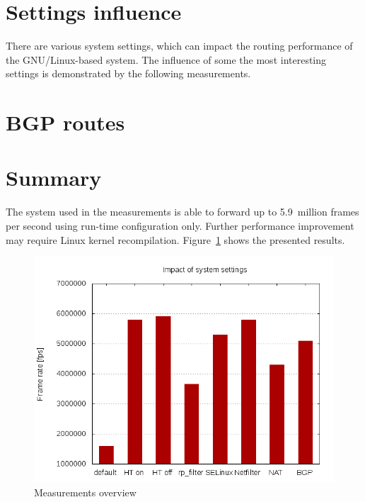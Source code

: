 	

	

	

	

\section{Settings influence}
There are various system settings, which can impact the routing performance of the GNU/Linux-based system.
The influence of some the most interesting settings is demonstrated by the following measurements.

	

	

	

	

	

	

\section{BGP routes}

	

\section{Summary}
The system used in the measurements is able to forward up to 5.9~million frames per second
using run-time configuration only.
Further performance improvement may require Linux kernel recompilation.
Figure~\ref{fig:measurements-overview} shows the presented results.
	\begin{figure}[H]
		\centering
		\includegraphics[width=12cm,keepaspectratio]{fig/settings.png}
		\caption{Measurements overview}
		\label{fig:measurements-overview}
	\end{figure}


